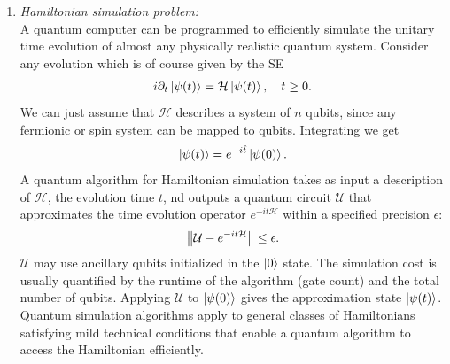 \documentclass{book}
\theoremstyle{definition}
\newcommand{\p}{\partial}
\newcommand{\had}{\mathcal{H}}
\newcommand{\U}{\mathcal{U}}
\begin{document}
\begin{enumerate}
	\item \textit{Hamiltonian simulation problem:}  \\
	
	A quantum computer can be programmed to efficiently simulate the unitary time evolution of almost any physically realistic quantum system. Consider any evolution which is of course given by the SE
	\begin{align}
	i \p_t \ket{\psi(t)} = \had \ket{\psi(t)}, \quad t \geq 0.
	\end{align}
	We can just assume that $\had$ describes a system of $n$ qubits, since any fermionic or spin system can be mapped to qubits. Integrating we get
	\begin{align}
	\ket{\psi(t)} = e^{-i\hat t}\ket{\psi(0)}.
	\end{align}
	A quantum algorithm for Hamiltonian simulation takes as input a description of $\had$, the evolution time $t$, nd outputs a quantum circuit $\U$ that approximates the time evolution operator $e^{-it\had}$ within a specified precision $\epsilon$:
	\begin{align}
	\norm{\U - e^{-it\had}} \leq \epsilon.
	\end{align}
	$\U$ may use ancillary qubits initialized in the $\ket{0}$ state. The simulation cost is usually quantified by the runtime of the algorithm (gate count) and the total number of qubits. Applying $\U$ to $\ket{\psi(0)}$ gives the approximation state $\ket{\psi(t)}$. \\
	
	
	Quantum simulation algorithms apply to general classes of Hamiltonians satisfying mild technical conditions that enable a quantum algorithm to access the Hamiltonian efficiently.

\end{enumerate}
\end{document}

